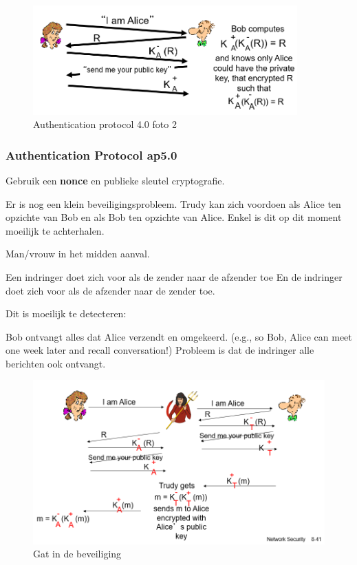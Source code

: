 \begin{figure}[h]
    \centering
    \includegraphics[width=4in]{./img/imghfdst8/hfdst8puntje21.png}
    \caption{Authentication protocol 4.0 foto 2 }      
    \label{fig:Authentication protocol 4.0 foto 2 }
\end{figure}
 
\newpage

\subsubsection{Authentication Protocol ap5.0}

\noindent Gebruik een \textbf{nonce} en publieke sleutel cryptografie.

\noindent Er is nog een klein beveiligingsprobleem. Trudy kan zich voordoen als Alice ten opzichte van Bob en als Bob ten opzichte van Alice. Enkel is dit op dit moment moeilijk te achterhalen.


\noindent Man/vrouw in het midden aanval.

\fra Een indringer doet zich voor als de zender naar de afzender toe
\fra En de indringer doet zich voor als de afzender naar de zender toe.

\noindent Dit is moeilijk te detecteren:

\bi
\itf 	Bob ontvangt alles dat Alice verzendt en omgekeerd. (e.g., so Bob, Alice can meet one week later and recall conversation!)
\itf Probleem is dat de indringer alle berichten ook ontvangt.
\ei

\begin{figure}[h]
    \centering
   \includegraphics[width=5in]{./img/imghfdst8/hfdst8puntje22.png}
    \caption{Gat in de beveiliging }      
    \label{fig:Gat in de beveiliging }
\end{figure}